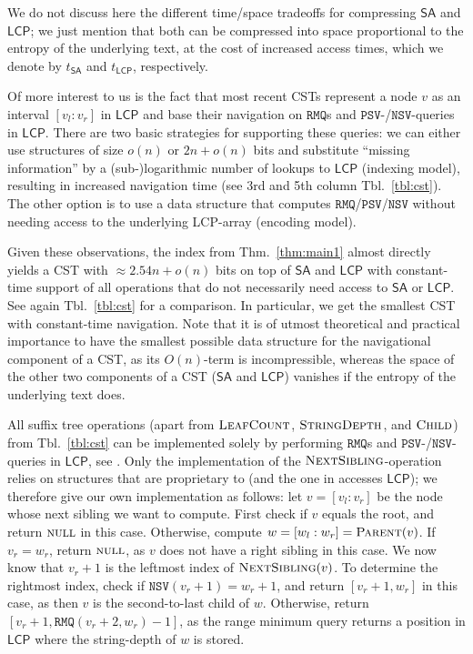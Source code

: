 \documentclass[11pt,onecolumn,final]{article} \usepackage{a4}
\newcommand{\LCP}[0]{\mathsf{LCP}}
\newcommand{\SUF}[0]{\mathsf{SA}}
\newcommand{\psv}[0]{\mathtt{PSV}}
\newcommand{\nsv}[0]{\mathtt{NSV}}
\newcommand{\rmq}[0]{\mathtt{RMQ}}
\newcommand{\parent}{\ensuremath{\textsc{Parent}}}
\newcommand{\sdepth}{\ensuremath{\textsc{StringDepth}}}
\newcommand{\scount}{\ensuremath{\textsc{LeafCount}}}
\newcommand{\nsibling}{\ensuremath{\textsc{NextSibling}}}
\newcommand{\child}{\ensuremath{\textsc{Child}}}
\newcommand{\Null}{\ensuremath{\textsc{null}}}
\theoremstyle{plain}
\theoremstyle{remark}
\begin{document}
We do not discuss here the different time/space tradeoffs for compressing $\SUF$ and $\LCP$; we just mention that both can be compressed into space proportional to the entropy of the underlying text, at the cost of increased access times, which we denote by $t_\SUF$ and $t_\LCP$, respectively.

Of more interest to us is the fact that most recent CSTs \cite{fischer09faster,ohlebusch09compressed,ohlebusch10cst++} represent a node $v$ as an interval $[v_l:v_r]$ in $\LCP$ and base their navigation on $\rmq$s and $\psv$-/$\nsv$-queries in $\LCP$. There are two basic strategies for supporting these queries: we can either use structures of size $o(n)$ \cite{fischer09faster,canovas10practical} or $2n+o(n)$ \cite{ohlebusch09compressed} bits and substitute ``missing information'' by a (sub-)logarithmic number of lookups to $\LCP$ (indexing model), resulting in increased navigation time (see 3rd and 5th column Tbl.~\ref{tbl:cst}). The other option \cite{ohlebusch10cst++} is to use a data structure that computes $\rmq$/$\psv$/$\nsv$ without needing access to the underlying LCP-array (encoding model).

Given these observations, the index from Thm.~\ref{thm:main1} almost directly yields a CST with $\approx 2.54n + o(n)$ bits on top of $\SUF$ and $\LCP$ with constant-time support of all operations that do not necessarily need access to $\SUF$ or $\LCP$. See again Tbl.~\ref{tbl:cst} for a comparison. In particular, we get the smallest CST with constant-time navigation. Note that it is of utmost theoretical and practical importance to have the smallest possible data structure for the navigational component of a CST, as its $O(n)$-term is incompressible, whereas the space of the other two components of a CST ($\SUF$ and $\LCP$) vanishes if the entropy of the underlying text does.

All suffix tree operations (apart from $\scount$, $\sdepth$, and $\child$) from Tbl.~\ref{tbl:cst} can be implemented solely by performing $\rmq$s and $\psv$-/$\nsv$-queries in $\LCP$, see \cite{fischer09faster,ohlebusch10cst++}. Only the implementation of the $\nsibling$-operation relies on structures that are proprietary to \cite{ohlebusch10cst++} (and the one in \cite{fischer09faster} accesses $\LCP$); we therefore give our own implementation as follows: let $v=[v_l:v_r]$ be the node whose next sibling we want to compute. First check if $v$ equals the root, and return $\Null$ in this case. Otherwise, compute $w=[w_l:w_r]=\parent(v)$. If $v_r=w_r$, return $\Null$, as $v$ does not have a right sibling in this case. We now know that $v_r+1$ is the leftmost index of $\nsibling(v)$. To determine the rightmost index, check if $\nsv(v_r+1)=w_r+1$, and return $[v_r+1,w_r]$ in this case, as then $v$ is the second-to-last child of $w$. Otherwise, return $[v_r+1,\rmq(v_r+2,w_r)-1]$, as the range minimum query returns a position in $\LCP$ where the string-depth of $w$ is stored.
\end{document}
